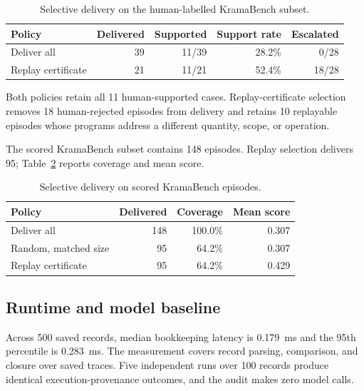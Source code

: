 \begin{table}[t]
\centering
\caption{Selective delivery on the human-labelled KramaBench subset.}
\label{tab:app-human-delivery}
\scriptsize
\setlength{\tabcolsep}{3pt}
\renewcommand{\arraystretch}{1.06}
\begin{tabularx}{\columnwidth}{@{}Xrrrr@{}}
\toprule
Policy
& Delivered
& Supported
& Support rate
& Escalated \\
\midrule
Deliver all
& 39
& 11/39
& 28.2\%
& 0/28 \\

Replay certificate
& 21
& 11/21
& 52.4\%
& 18/28 \\
\bottomrule
\end{tabularx}
\end{table}

Both policies retain all 11 human-supported cases. Replay-certificate
selection removes 18 human-rejected episodes from delivery and
retains 10 replayable episodes whose programs address a different
quantity, scope, or operation.

The scored KramaBench subset contains 148 episodes. Replay selection
delivers 95; Table~\ref{tab:app-scored-delivery} reports coverage and
mean score.

\begin{table}[t]
\centering
\caption{Selective delivery on scored KramaBench episodes.}
\label{tab:app-scored-delivery}
\scriptsize
\setlength{\tabcolsep}{4pt}
\begin{tabular}{@{}lrrr@{}}
\toprule
Policy & Delivered & Coverage & Mean score \\
\midrule
Deliver all
& 148 & 100.0\% & 0.307 \\
Random, matched size
& 95 & 64.2\% & 0.307 \\
Replay certificate
& 95 & 64.2\% & 0.429 \\
\bottomrule
\end{tabular}
\end{table}

\subsection{Runtime and model baseline}

Across 500 saved records, median bookkeeping latency is 0.179~ms
and the 95th percentile is 0.283~ms. The measurement covers record
parsing, comparison, and closure over saved traces. Five independent
runs over 100 records produce identical execution-provenance
outcomes, and the audit makes zero model calls.

